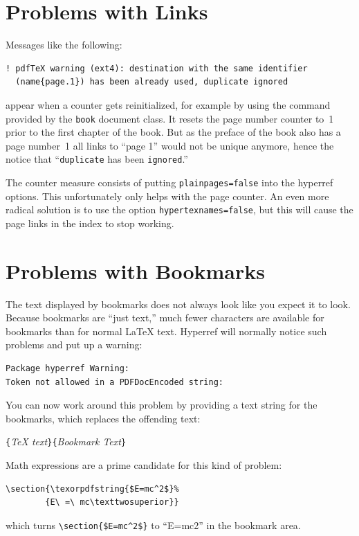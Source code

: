 \documentclass[twoside,11pt,letterpaper]{article}
\begin{document}
\section{Problems with Links}

Messages like the following:
\begin{verbatim}
! pdfTeX warning (ext4): destination with the same identifier
  (name{page.1}) has been already used, duplicate ignored
\end{verbatim}
appear when a counter gets reinitialized, for example by using
the command  provided by the \texttt{book} document class. It
resets the page number counter to~1 prior to the first chapter of the
book. But as the preface of the book also has a page number~1 all
links to ``page 1'' would not be unique anymore, hence the notice
that ``\verb+duplicate+ has been \verb+ignored+.''

The counter measure consists of putting \texttt{plainpages=false} into
the hyperref options. This unfortunately only helps with the page
counter.
An even more radical solution is to use the option
\texttt{hypertexnames=false}, but this will cause the page links in
the index to stop working.

\section{Problems with Bookmarks}

The text displayed by bookmarks does not always look like you expect
it to look. Because bookmarks are ``just text,'' much fewer
characters are available for bookmarks than for normal \LaTeX{} text.
Hyperref will normally notice such problems and put up a warning:
\begin{code}
\begin{verbatim}
Package hyperref Warning: 
Token not allowed in a PDFDocEncoded string:
\end{verbatim}
\end{code}
You can now work around this problem by providing a text string for
the bookmarks, which replaces the offending text:
\begin{lscommand}
\verb|{|\emph{\TeX{} text}\verb|}{|\emph{Bookmark Text}\verb|}|
\end{lscommand}


Math expressions are a prime candidate for this kind of problem:
\begin{code}
\begin{verbatim}
\section{\texorpdfstring{$E=mc^2$}%
        {E\ =\ mc\texttwosuperior}}
\end{verbatim}
\end{code}
which turns \verb+\section{$E=mc^2$}+ to ``E=mc2'' in the bookmark area.
\end{document}

